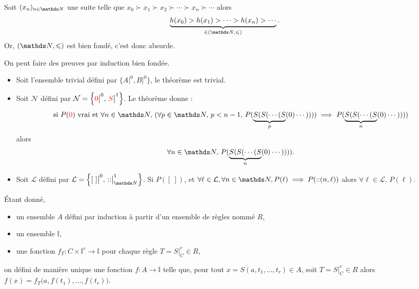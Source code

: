 \begin{prv}
	Soit $(x_n)_{n\in\N}$\/ une suite telle que $x_0 \succ x_1\succ x_2\succ \cdots \succ x_n \succ  \cdots $\/ alors \[\underbrace{h(x_0) > h(x_1) > \cdots > h(x_n) > \cdots}_{\in (\N, \le )}.\] Or, $(\N, \le)$\/ est bien fondé, c'est donc absurde.
\end{prv}

\begin{rmk}
	On peut faire des preuves par induction bien fondée.
\end{rmk}

\begin{exm}
	\begin{itemize}
		\item Soit l'ensemble trivial défini par $\Big\{A\big|^0, B\big|^0\Big\}$, le théorème est trivial.
		\item Soit $\mathcal{N}$\/ défini par $\mathcal{N} = \Big\{{\color{red}0}\big|^0,\,{\color{red}S}\big|^1\Big\}$. Le théorème donne : \[
				\text{si } P(\red 0) \text{ vrai et } \forall n \in \N,\,(\forall p \in \N,\,p < n - 1,\,P(\underbrace{S(S(\cdots(S}_{p}(0)\cdots)))) \implies P(\underbrace{S(S(\cdots(S}_{n}(0)\cdots))))
			\] alors \[
				\forall n \in \N,\,P(\underbrace{S(S(\cdots(S}_{n}(0)\cdots))))
			.\] 
		\item Soit $\mathcal{L}$\/ défini par $\mathcal{L} = \Big\{[~]\big|^0,\,{::}\big|^1_{\N}\Big\} $. Si $P([~])$, et $\forall \ell \in \mathcal{L},\forall n \in \N, P(\ell) \implies P({::}(n, \ell))$\/ alors $\forall \ell \in \mathcal{L},\,P(\ell)$.
	\end{itemize}
\end{exm}

\begin{prop}
	Étant donné,
	\begin{itemize}
		\item un ensemble $A$\/ défini par induction à partir d'un ensemble de règles nommé $R$,
		\item un ensemble $\mathds{I}$,
		\item une fonction $f_T : C \times \mathds{I}^r  \to  \mathds{I}$\/ pour chaque règle $T = S\big|^r_C \in R$,
	\end{itemize}
	on défini de manière unique une fonction $f : A \to \mathds{I}$\/ telle que, pour tout $x = S(a, t_1, \ldots, t_r) \in A$, soit $T = S\big|_C^r \in R$\/ alors $f(x) = f_T\big(a, f(t_1), \ldots, f(t_r)\big)$.
\end{prop}

